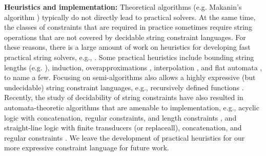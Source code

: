 


\smallskip
\noindent
\textbf{Heuristics and implementation:}
Theoretical algorithms
(e.g. Makanin's algorithm \cite{Makanin}) typically do not directly lead to 
practical solvers. At the same time, the classes of constraints that are 
required in practice sometimes require string operations that are not covered by
decidable string constraint languages.
For these reasons,
there is a large amount of work on heuristics for developing fast practical
string solvers, e.g., 
\cite{BTV09,Berkeley-JavaScript,HAMPI,Stranger,YABI14,Abdulla14,fang-yu-circuits,Abdulla17,HJLRV18,S3,TCJ16,Z3-str,Z3-str2,cvc4,Saner,RVG12}.
Some practical heuristics include
bounding string lengths (e.g. \cite{HAMPI,Berkeley-JavaScript,BTV09}), 
induction, overapproximations \cite{Stranger,YABI14}, interpolation
\cite{Abdulla14}, and flat automata \cite{Abdulla17}, to name a few. 
Focusing on semi-algorithms also allows a highly expressive (but undecidable) 
string 
constraint languages, e.g., recursively defined functions \cite{S3,TCJ16}. 
Recently, the study of decidability of string constraints have also resulted in
automata-theoretic algorithms that are amenable to implementation, e.g.,
acyclic logic with concatenation, regular constraints, and length constraints 
\cite{Abdulla14}, and straight-line logic with finite transducers (or
replaceall), concatenation, and regular constraints 
\cite{HJLRV18,fang-yu-circuits,yan-tool}. 
We leave the development of practical heuristics for our more expressive 
constraint language for future work.

